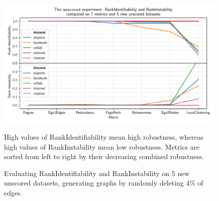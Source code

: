 \begin{figure}
    \includegraphics[width=\linewidth]{plot_unscored.pdf}
    \vspace*{-0.6cm}
    \caption{Evaluating RankIdentifiability and RankInstability on 5 new unscored datasets, generating graphs by randomly deleting $4\%$ of edges.}
    \label{fig:plot_unscored}
    \footnotesize\justify\vspace{-0.4\baselineskip}
    High values of RankIdentifiability mean high robustness, whereas high values of RankInstability mean low robustness.
    Metrics are sorted from left to right by their decreasing combined robustness.
\end{figure}
